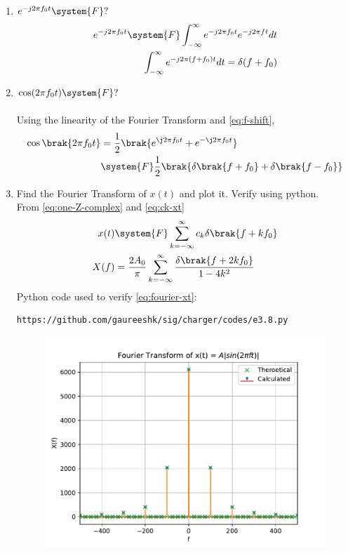 \documentclass[journal,12pt,twocolumn]{IEEEtran}
\renewcommand\thesection{\arabic{section}}
\begin{document}
\begin{enumerate}[label=\thesection.\arabic*
,ref=\thesection.\theenumi]
\begin{align}
	= e^{\j 2\pi (0) t} = 1
	\label{eq:fourier-delta}
\end{align}
\item $e^{-j2\pi f_0t}\system{F}?$\\
\solution %
\begin{align}
	e^{-j2\pi f_0t}\system{F} \int_{-\infty}^{\infty} e^{-j2\pi f_0t} e^{-j2\pi ft}dt\\
	\int_{-\infty}^{\infty} e^{-j2\pi (f+f_0)t} dt
	=\delta(f+f_0)
	\label{eq:f-shift}
\end{align}
\item $\cos(2\pi f_0t)\system{F}?$\\
\solution\\
Using the linearity of the Fourier Transform and \eqref{eq:f-shift},
\begin{align}
	\cos\brak{2\pi f_0t} &= \frac{1}{2}
	\brak{e^{\j2\pi f_0t} + e^{-\j2\pi f_0t}} \nonumber \\ 
	&\system{F}\frac{1}{2}\brak{\delta\brak{f+f_0} + \delta\brak{f-f_0}}
\end{align}
 \item Find the Fourier Transform of $x(t)$ and plot it.  Verify using python.\\
 \solution From \eqref{eq:one-Z-complex} and \eqref{eq:ck-xt}
\begin{align}
 x(t)&\system{F}\sum_{k=-\infty}^{\infty}c_k\delta\brak{f+kf_0} \\
 X(f)&=\frac{2A_0}{\pi}\sum_{k=-\infty}^{\infty}\frac{\delta\brak{f+2kf_0}}{1-4k^2}
 \label{eq:fourier-xt}
\end{align}
Python code used to verify \eqref{eq:fourier-xt}:
\begin{lstlisting}
https://github.com/gaureeshk/sig/charger/codes/e3.8.py
\end{lstlisting}
\begin{figure}[!ht]
	\begin{center}
		\includegraphics[width=\columnwidth]{./figs/e3.8.pdf}

\end{center}
\end{figure}
\end{enumerate}
\end{document}
